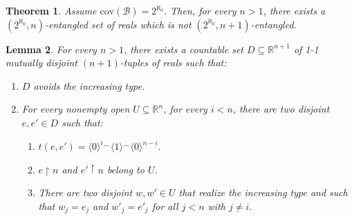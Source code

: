 \documentclass[12pt]{amsart}
\newtheorem{theorem}{Theorem}[section]
\newtheorem{lemma}[theorem]{Lemma}
\theoremstyle{definition}
\theoremstyle{remark}
\begin{document}
\begin{theorem}\label{thm:1s}
Assume $\mathrm{cov}(\mathcal{B}) = 2^{\aleph_0}$. Then, for every $n > 1$, there exists a $(2^{\aleph_0}, n)$-entangled set of reals which is not $(2^{\aleph_0}, n+1)$-entangled.
\end{theorem}
\begin{lemma}\label{lemma:1}
For every $n > 1$, there exists a countable set $D \subseteq \mathbb{R}^{n+1}$ of 1-1 mutually disjoint $(n+1)$-tuples of reals such that:
\begin{enumerate}[label={\upshape (\arabic*)}]
\itemsep0.3em
\item $D$ avoids the increasing type.
\item For every nonempty open $U \subseteq \mathbb{R}^n$, for every $i< n$, there are two disjoint $e,e' \in D$ such that:\vspace{0.3em}
\begin{enumerate}[label={\upshape (2\alph*)}]
\itemsep0.3em
\item $t(e,e') = \langle 0 \rangle^i{}^\smallfrown \langle 1 \rangle{}^\smallfrown \langle 0 \rangle^{n-i}$.
\item $e \upharpoonright n$ and $e' \upharpoonright n$ belong to $U$.
\item There are two disjoint $w,w' \in U$ that realize the increasing type and such that $w_j = e_j$ and $w'_j = e'_j$ for all $j < n$ with $j \neq i$.
\end{enumerate}
\end{enumerate}
\end{lemma}
\end{document}
